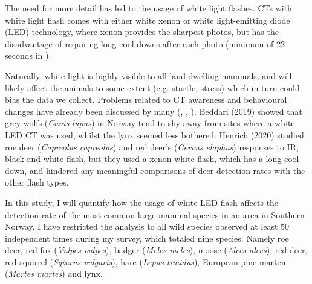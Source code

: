The need for more detail has led to the usage of white light flashes.
CTs with white light flash comes with either white xenon or white light-emitting diode (LED) technology, where xenon provides the sharpest photos, but has the disadvantage of requiring long cool downs after each photo (minimum of 22 seconds %
in \cite{Henrich2020}).

Naturally, white light is highly visible to all land dwelling mammals, and will likely affect the animals to some extent (e.g. startle, stress) which in turn could bias the data we collect. Problems related to CT awareness and behavioural changes have already been discussed by many (\cite{Meek2014}, \cite{Burton2015}, \cite{Hofmeester2019}). %
Beddari (2019) showed that grey wolfs (\textit{Canis lupus}) in Norway tend to shy away from sites where a white LED CT was used, whilst the  lynx  seemed less bothered. %
Henrich (2020) studied roe deer (\textit{Capreolus capreolus}) and red deer's (\textit{Cervus elaphus}) responses to IR, black and white flash, but they used a xenon white flash, which has a long cool down, and hindered any meaningful comparisons of deer detection rates with the other flash types.




%



In this study, I will quantify how the usage of white LED flash affects the detection rate of the most common large mammal species in an area in Southern Norway.
I have restricted the analysis to all wild species observed at least 50 independent times during my survey, which totaled nine species.
Namely roe deer, red fox (\textit{Vulpes vulpes}), badger (\textit{Meles meles}), moose (\textit{Alces alces}), red deer, red squirrel (\textit{Sqiurus vulgaris}), hare (\textit{Lepus timidus}), European pine marten (\textit{Martes martes}) and lynx. 


